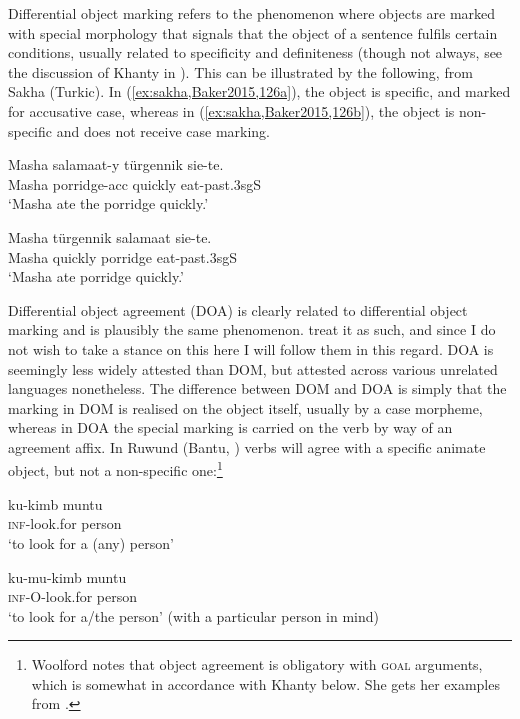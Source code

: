 \documentclass[output=paper
,modfonts
,nonflat]{langsci/langscibook}
\begin{document}
Differential object marking refers to the phenomenon where objects are mark\-ed with special morphology that signals that the object of a sentence fulfils certain conditions, usually related to specificity and definiteness (though not always, see the discussion of Khanty in ).
This can be illustrated by the following, from Sakha (Turkic).
In (\ref{ex:sakha,Baker2015,126a}), the object is specific, and marked for accusative case, whereas in (\ref{ex:sakha,Baker2015,126b}), the object is non-specific and does not receive case marking.

\begin{exe}
  \ex {}\label{ex:sakha,Baker2015,126}
\begin{xlist}
\ex
\gll Masha salamaat-y türgennik sie-te.\\
Masha porridge-{\sc acc} quickly eat-{\sc past.3sgS}\\
\glt `Masha ate the porridge quickly.'  \label{ex:sakha,Baker2015,126a}

\ex
\gll Masha türgennik salamaat sie-te.\\
Masha quickly porridge eat-{\sc past.3sgS}\\
\glt `Masha ate porridge quickly.' \label{ex:sakha,Baker2015,126b}
\end{xlist}
\end{exe}


\noindent Differential object agreement (DOA) is clearly related to differential object marking and is plausibly the same phenomenon.
\citeauthor{dn2011} treat it as such, and since I do not wish to take a stance on this here I will follow them in this regard.
DOA is seemingly less widely attested than DOM, but attested across various unrelated languages nonetheless.
The difference between DOM and DOA is simply that the marking in DOM is realised on the object itself, usually by a case morpheme, whereas in DOA the special marking is carried on the verb by way of an agreement affix.
In Ruwund (Bantu, \citealt{woolford2001}) verbs will agree with a specific animate object, but not a non-specific one:\footnote{Woolford notes that object agreement is obligatory with \textsc{goal} arguments, which is somewhat in accordance with Khanty below.
She gets her examples from \citet[][565]{nash1992}.}

\begin{exe}
\ex {}\label{ex:ruwund}
\begin{xlist}
\ex
{\gll ku-kimb muntu\\
\textsc{inf}-look.for person\\
\glt `to look for a (any) person'} \label{ex:ruwunda}

\ex
{\gll ku-mu-kimb muntu\\
\textsc{inf-O}-look.for person\\
\glt `to look for a/the person' (with a particular person in mind)}  \label{ex:ruwundb}
\end{xlist}
\end{exe}
\end{document}
